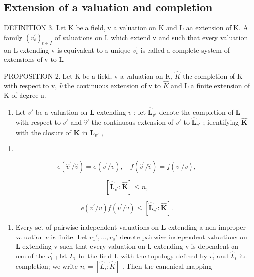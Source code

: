 \subsection{Extension of a valuation and completion}

DEFINITION 3. Let K be a field, v a valuation on K and L an extension of K. A family \((v_{t}^{\prime})_{t\in I}\) of valuations on L which extend v and such that every valuation on L extending v is equivalent to a unique \(v_{t}^{\prime}\) is called a complete system of extensions of v to L.

PROPOSITION 2. Let K be a field, v a valuation on K, \(\hat{K}\) the completion of K with respect to v, \(\hat{v}\) the continuous extension of v to \(\hat{K}\) and L a finite extension of K of degree n.

\begin{enumerate}
\def\labelenumi{(\alph{enumi})}
\tightlist
\item
  Let \(v'\) be a valuation on \(\mathbf{L}\) extending \(v\) ; let \(\hat{\mathbf{L}}_{v'}\) denote the completion of \(\mathbf{L}\) with respect to \(v'\) and \(\hat{v}'\) the continuous extension of \(v'\) to \(\hat{\mathbf{L}}_{v'}\) ; identifying \(\hat{\mathbf{K}}\) with the closure of \(\mathbf{K}\) in \(\hat{\mathbf{L}}_{v'}\) ,
\end{enumerate}

\begin{enumerate}
\def\labelenumi{(\arabic{enumi})}
\setcounter{enumi}{3}
\tightlist
\item
\end{enumerate}

\[
e (\hat {v} ^ {\prime} / \hat {v}) = e (v ^ {\prime} / v), \quad f (\hat {v} ^ {\prime} / \hat {v}) = f (v ^ {\prime} / v),\tag{5}
\]

\[
[ \hat {\mathbf {L}} _ {v ^ {\prime}}: \hat {\mathbf {K}} ] \leqslant n,\tag{6}
\]

\[
e (v ^ {\prime} / v) f (v ^ {\prime} / v) \leqslant [ \hat {\mathbf {L}} _ {v ^ {\prime}}: \hat {\mathbf {K}} ].
\]

\begin{enumerate}
\def\labelenumi{(\alph{enumi})}
\setcounter{enumi}{1}
\tightlist
\item
  Every set of pairwise independent valuations on \(\mathbf{L}\) extending a non-improper valuation \(v\) is finite. Let \(v_{1}',\ldots ,v_{s}'\) denote pairwise independent valuations on \(\mathbf{L}\) extending v such that every valuation on L extending v is dependent on one of the \(v_{i}^{\prime}\) ; let \(L_{i}\) be the field L with the topology defined by \(v_{i}^{\prime}\) and \(\hat{L}_{i}\) its completion; we write \(n_{i} = [\hat{L}_{i}: \hat{K}]\) . Then the canonical mapping
\end{enumerate}

